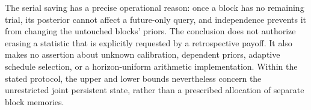 The serial saving has a precise operational reason: once a block has no
remaining trial, its posterior cannot affect a future-only query, and
independence prevents it from changing the untouched blocks' priors.
The conclusion does not authorize erasing a statistic that is explicitly
requested by a retrospective payoff. It also makes no assertion about
unknown calibration, dependent priors, adaptive schedule selection, or a
horizon-uniform arithmetic implementation. Within the stated protocol,
the upper and lower bounds nevertheless concern the unrestricted joint
persistent state, rather than a prescribed allocation of separate block
memories.
